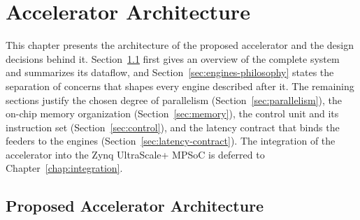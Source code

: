 %
\chapter{Accelerator Architecture}
\label{chap:architecture}

This chapter presents the architecture of the proposed accelerator and the
design decisions behind it. Section~\ref{sec:arch-overview} first gives an
overview of the complete system and summarizes its dataflow, and
Section~\ref{sec:engines-philosophy} states the separation of concerns that
shapes every engine described after it. The remaining sections justify the
chosen degree of parallelism (Section~\ref{sec:parallelism}), the on-chip
memory organization (Section~\ref{sec:memory}), the control unit and its
instruction set (Section~\ref{sec:control}), and the latency contract that
binds the feeders to the engines (Section~\ref{sec:latency-contract}). The
integration of the accelerator into the Zynq UltraScale+ MPSoC is deferred to
Chapter~\ref{chap:integration}.

\section{Proposed Accelerator Architecture}
\label{sec:arch-overview}

